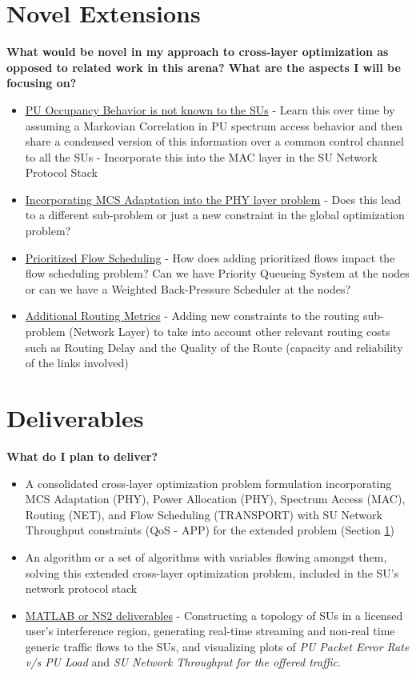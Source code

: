 \documentclass[12pt, draftcls, onecolumn]{IEEEtran}
\begin{document}
\section{Novel Extensions}\label{II}
\textbf{What would be novel in my approach to cross-layer optimization as opposed to related work in this arena? What are the aspects I will be focusing on?}
\begin{itemize}
    \item \underline{PU Occupancy Behavior is not known to the SUs} - Learn this over time by assuming a Markovian Correlation in PU spectrum access behavior and then share a condensed version of this information over a common control channel to all the SUs - Incorporate this into the MAC layer in the SU Network Protocol Stack
    \item \underline{Incorporating MCS Adaptation into the PHY layer problem} - Does this lead to a different sub-problem or just a new constraint in the global optimization problem?
    \item \underline{Prioritized Flow Scheduling} - How does adding prioritized flows impact the flow scheduling problem? Can we have Priority Queueing System at the nodes or can we have a Weighted Back-Pressure Scheduler at the nodes?
    \item \underline{Additional Routing Metrics} - Adding new constraints to the routing sub-problem (Network Layer) to take into account other relevant routing costs such as Routing Delay and the Quality of the Route (capacity and reliability of the links involved)
\end{itemize}
\section{Deliverables}
\textbf{What do I plan to deliver?}
\begin{itemize}
    \item A consolidated cross-layer optimization problem formulation incorporating MCS Adaptation (PHY), Power Allocation (PHY), Spectrum Access (MAC), Routing (NET), and Flow Scheduling (TRANSPORT) with SU Network Throughput constraints (QoS - APP) for the extended problem (Section \ref{II})
    \item An algorithm or a set of algorithms with variables flowing amongst them, solving this extended cross-layer optimization problem, included in the SU's network protocol stack
    \item \underline{MATLAB or NS2 deliverables} - Constructing a topology of SUs in a licensed user's interference region, generating real-time streaming and non-real time generic traffic flows to the SUs, and visualizing plots of \textit{PU Packet Error Rate v/s PU Load} and \textit{SU Network Throughput for the offered traffic}.
\end{itemize}
\end{document}
